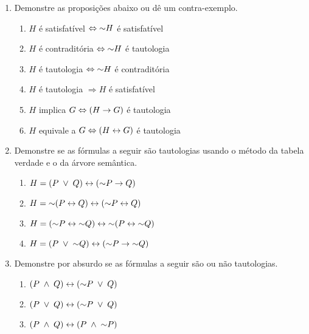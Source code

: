 \begin{enumerate}
  \item Demonstre as proposições abaixo ou dê um contra-exemplo.
    \begin{enumerate}
      \item $H$ é satisfatível $\Leftrightarrow \mathord{\sim} H$ é satisfatível
      \item $H$ é contraditória $\Leftrightarrow \mathord{\sim} H$ é tautologia
      \item $H$ é tautologia $\Leftrightarrow \mathord{\sim} H$ é contraditória
      \item $H$ é tautologia $\Rightarrow H$ é satisfatível
      \item $H$ implica $G \Leftrightarrow ( H \rightarrow G )$ é tautologia
      \item $H$ equivale a $G \Leftrightarrow ( H \leftrightarrow G )$ é tautologia
    \end{enumerate}

  \item Demonstre se as fórmulas a seguir são tautologias usando o método da tabela verdade e o da árvore semântica.
    \begin{enumerate}
      \item $H = ( P \;\lor\; Q ) \leftrightarrow (\mathord{\sim} P \rightarrow Q )$
      \item $H = \mathord{\sim} ( P \leftrightarrow Q ) \leftrightarrow (\mathord{\sim} P \leftrightarrow Q )$
      \item $H = (\mathord{\sim} P \leftrightarrow \mathord{\sim} Q ) \leftrightarrow \mathord{\sim} ( P \leftrightarrow \mathord{\sim} Q )$
      \item $H = ( P \;\lor\; \mathord{\sim} Q ) \leftrightarrow ( \mathord{\sim} P  \rightarrow \mathord{\sim} Q )$
    \end{enumerate}

  \item Demonstre por absurdo se as fórmulas a seguir são ou não tautologias.
    \begin{enumerate}
      \item $( P \;\land\; Q ) \leftrightarrow (\mathord{\sim} P \;\lor\; Q )$
      \item $( P \;\lor\; Q ) \leftrightarrow (\mathord{\sim} P \;\lor\; Q )$
      \item $( P \;\land\; Q ) \leftrightarrow ( P \;\land\; \mathord{\sim} P )$
    \end{enumerate}

\end{enumerate}

  
  

  
